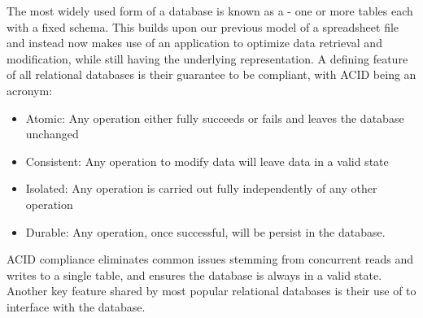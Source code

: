 The most widely used form of a database is known as a  - one or more tables each with a fixed schema. This builds upon our previous model of a spreadsheet file and instead now makes use of an application to optimize data retrieval and modification, while still having the underlying representation. A defining feature of all relational databases is their guarantee to be  compliant, with ACID being an acronym:

\begin{itemize}
    \item Atomic: Any operation either fully succeeds or fails and leaves the database unchanged
    \item Consistent: Any operation to modify data will leave data in a valid state
    \item Isolated: Any operation is carried out fully independently of any other operation
    \item Durable: Any operation, once successful, will be persist in the database.
\end{itemize}

ACID compliance eliminates common issues stemming from concurrent reads and writes to a single table, and ensures the database is always in a valid state. Another key feature shared by most popular relational databases is their use of  to interface with the database.

